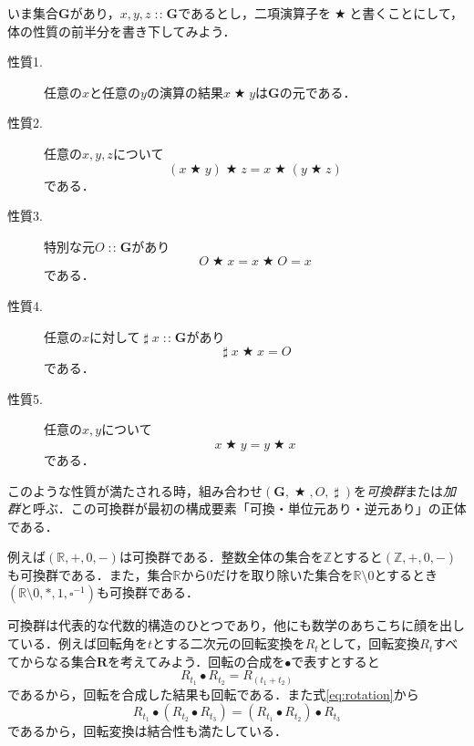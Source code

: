 \documentclass[twocolumn]{jsbook}
\newcommand{\keyword}[1]{{\emph{#1}}}
\DeclareMathOperator{\mathAnyBinaryOperator}{\bigstar}
\DeclareMathOperator{\mathIn}{:\!:}
\DeclareMathOperator{\mathInverse}{\sharp}
\newcommand{\mathSomething}{\square}
\newcommand{\mathSet}[1]{\mathbf{#1}} %
\newcommand{\mathSpecialSet}[1]{\mathbb{#1}} %
\newcommand{\mathGroup}[4]{(#1,#2,#3,#4)}
\begin{document}
いま集合$\mathSet{G}$があり，$x,y,z\mathIn\mathSet{G}$であるとし，二項演算子を$\mathAnyBinaryOperator$と書くことにして，体の性質の前半分を書き下してみよう．
\begin{description}
\item[性質1.] 任意の$x$と任意の$y$の演算の結果$x\mathAnyBinaryOperator y$は$\mathSet{G}$の元である．
\item[性質2.] 任意の$x,y,z$について
\begin{equation}
(x\mathAnyBinaryOperator y)\mathAnyBinaryOperator z=x\mathAnyBinaryOperator(y\mathAnyBinaryOperator z)
\end{equation}
である．
\item[性質3.] 特別な元$O\mathIn\mathSet{G}$があり
\begin{equation}
O\mathAnyBinaryOperator x=x\mathAnyBinaryOperator O=x
\end{equation}
である．
\item[性質4.] 任意の$x$に対して$\mathInverse x\mathIn\mathSet{G}$があり
\begin{equation}
\mathInverse x\mathAnyBinaryOperator x=O
\end{equation}
である．
\item[性質5.] 任意の$x,y$について
\begin{equation}
x\mathAnyBinaryOperator y=y\mathAnyBinaryOperator x
\end{equation}
である．
\end{description}
このような性質が満たされる時，組み合わせ$\mathGroup{\mathSet{G}}{\mathAnyBinaryOperator}{O}{\mathInverse}$を\keyword{可換群}または\keyword{加群}と呼ぶ．この可換群が最初の構成要素「可換・単位元あり・逆元あり」の正体である．

例えば$\mathGroup{\mathSpecialSet{R}}{+}{0}{-}$は可換群である．整数全体の集合を$\mathSpecialSet{Z}$とすると$\mathGroup{\mathSpecialSet{Z}}{+}{0}{-}$も可換群である．また，集合$\mathSpecialSet{R}$から$0$だけを取り除いた集合を$\mathSpecialSet{R}\setminus0$とするとき$\mathGroup{\mathSpecialSet{R}\setminus0}{*}{1}{\mathSomething^{-1}}$も可換群である．

可換群は代表的な代数的構造のひとつであり，他にも数学のあちこちに顔を出している．例えば回転角を$t$とする二次元の回転変換を$R_t$として，回転変換$R_t$すべてからなる集合$\mathSet{R}$を考えてみよう．回転の合成を$\bullet$で表すとすると
\begin{equation}
\label{eq:rotation}
R_{t_1}\bullet R_{t_2}=R_{(t_1+t_2)}
\end{equation}
であるから，回転を合成した結果も回転である．また式\eqref{eq:rotation}から
\begin{equation}
R_{t_1}\bullet\left(R_{t_2}\bullet R_{t_3}\right)=\left(R_{t_1}\bullet R_{t_2}\right)\bullet R_{t_3}
\end{equation}
であるから，回転変換は結合性も満たしている．
\end{document}
